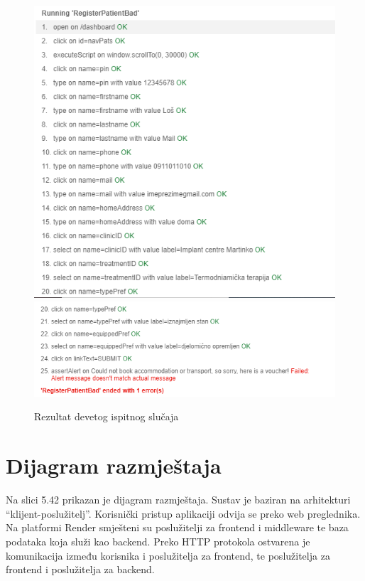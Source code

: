 			\begin{figure}[H]
				\centering
				\includegraphics[width=\textwidth]{"slike/Selenium/pacijent testovi/registerPatientBad_results0.png"}
				\includegraphics[width=\textwidth]{"slike/Selenium/pacijent testovi/registerPatientBad_results1.png"}
				\caption{Rezultat devetog ispitnog slučaja}
				\label{fig: registerPatientBad_results}
			\end{figure}
			\eject
			
		\section{Dijagram razmještaja}
			
			Na slici 5.42 prikazan je dijagram razmještaja. Sustav je baziran na arhitekturi “klijent-poslužitelj”. Korisnički pristup aplikaciji odvija se preko web preglednika. Na platformi Render smješteni su poslužitelji za frontend i middleware te baza podataka koja služi kao backend. Preko HTTP protokola ostvarena je komunikacija između korisnika i poslužitelja za frontend, te poslužitelja za frontend i poslužitelja za backend.
			
